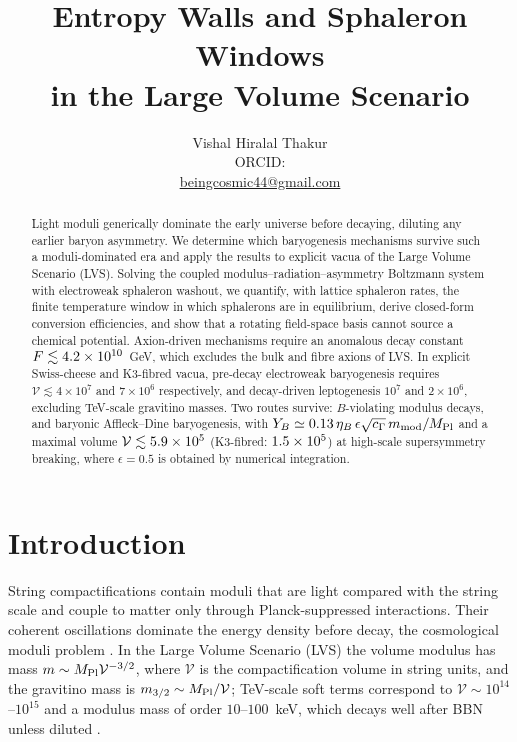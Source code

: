 \documentclass[11pt]{article}
\title{\bf Entropy Walls and Sphaleron Windows\\ in the Large Volume Scenario}
\author{Vishal Hiralal Thakur\ifx\orcidID\empty\else\\ {\small ORCID: \href{https://orcid.org/\orcidID}{\orcidID}}\fi\\ {\small \href{mailto:beingcosmic44@gmail.com}{beingcosmic44@gmail.com}}}
\date{}
\newcommand{\MP}{M_{\rm Pl}}
\begin{document}
\maketitle

\begin{abstract}
Light moduli generically dominate the early universe before decaying, diluting any earlier baryon asymmetry. We determine which baryogenesis mechanisms survive such a moduli-dominated era and apply the results to explicit vacua of the Large Volume Scenario (LVS). Solving the coupled modulus--radiation--asymmetry Boltzmann system with electroweak sphaleron washout, we quantify, with lattice sphaleron rates, the finite temperature window in which sphalerons are in equilibrium, derive closed-form conversion efficiencies, and show that a rotating field-space basis cannot source a chemical potential. Axion-driven mechanisms require an anomalous decay constant $F\lesssim4.2\times10^{10}$~GeV, which excludes the bulk and fibre axions of LVS. In explicit Swiss-cheese and K3-fibred vacua, pre-decay electroweak baryogenesis requires $\mathcal V\lesssim4\times10^{7}$ and $7\times10^{6}$ respectively, and decay-driven leptogenesis $10^{7}$ and $2\times10^{6}$, excluding TeV-scale gravitino masses. Two routes survive: $B$-violating modulus decays, and baryonic Affleck--Dine baryogenesis, with $Y_B\simeq0.13\,\eta_B\,\epsilon\sqrt{c_\Gamma}\,m_{\rm mod}/\MP$ and a maximal volume $\mathcal V\lesssim5.9\times10^{5}$ (K3-fibred: $1.5\times10^{5}$) at high-scale supersymmetry breaking, where $\epsilon=0.5$ is obtained by numerical integration.
\end{abstract}

\section{Introduction}
String compactifications contain moduli that are light compared with the string scale and couple to matter only through Planck-suppressed interactions. Their coherent oscillations dominate the energy density before decay, the cosmological moduli problem \cite{Coughlan:1983ci,Banks:1993en,deCarlos:1993jw}. In the Large Volume Scenario (LVS) \cite{Balasubramanian:2005zx,Conlon:2005ki} the volume modulus has mass $m\sim\MP\mathcal V^{-3/2}$, where $\mathcal V$ is the compactification volume in string units, and the gravitino mass is $m_{3/2}\sim\MP/\mathcal V$; TeV-scale soft terms correspond to $\mathcal V\sim10^{14}$--$10^{15}$ and a modulus mass of order $10$--$100$~keV, which decays well after BBN unless diluted \cite{Choi:2012}.
\end{document}
